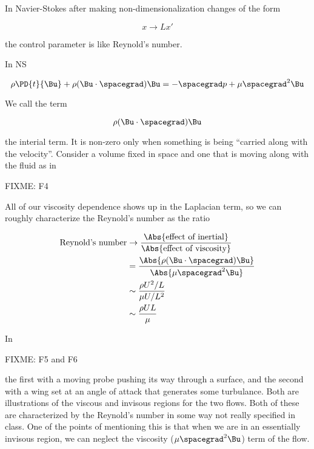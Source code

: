 In Navier-Stokes after making non-dimensionalization changes of the form

\begin{equation}\label{eqn:inclinedFlowWithoutConstantHeightAssumption:n}
x \rightarrow L x'
\end{equation}

the control parameter is like Reynold's number.

In NS

\begin{equation}\label{eqn:inclinedFlowWithoutConstantHeightAssumption:n}
\rho \PD{t}{\Bu} + \rho ( \Bu \cdot \spacegrad ) \Bu = - \spacegrad p + \mu \spacegrad^2 \Bu
\end{equation}

We call the term

\begin{equation}\label{eqn:inclinedFlowWithoutConstantHeightAssumption:n}
\rho ( \Bu \cdot \spacegrad ) \Bu
\end{equation}

the interial term.  It is non-zero only when something is being ``carried along with the velocity''.  Consider a volume fixed in space and one that is moving along with the fluid as in

FIXME: F4

All of our viscosity dependence shows up in the Laplacian term, so we can roughly characterize the Reynold's number as the ratio

\begin{align*}
\text{Reynold's number}
&\rightarrow
\frac{\Abs{\text{effect of inertial}}}{\Abs{\text{effect of viscosity}}}  \\
&=
\frac{ \Abs{\rho ( \Bu \cdot \spacegrad ) \Bu } }{\Abs{ \mu \spacegrad^2 \Bu}} \\
&\sim
\frac{ \rho U^2/L }{\mu U/L^2} \\
&\sim
\frac{ \rho U L }{\mu }
\end{align*}

In 

FIXME: F5 and F6

the first with a moving probe pushing its way through a surface, and the second with a wing set at an angle of attack that generates some turbulance.  Both are illustrations of the viscous and invisous regions for the two flows.  Both of these are characterized by the Reynold's number in some way not really specified in class.  One of the points of mentioning this is that when we are in an essentially invisous region, we can neglect the viscosity ($\mu \spacegrad^2 \Bu$) term of the flow.


\EndArticle
